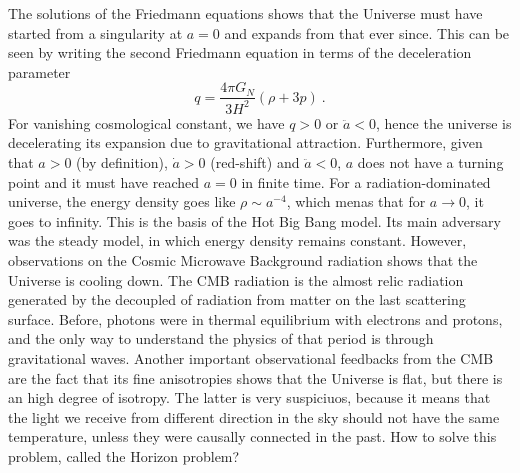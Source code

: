     The solutions of the Friedmann equations shows that the Universe must have started from a singularity at $a = 0$ and expands from that ever since. This can be seen by writing the second Friedmann equation in terms of the deceleration parameter
    \begin{equation*}
        q = \frac{4 \pi G_N}{3 H^2} (\rho + 3 p) ~.
    \end{equation*}
    For vanishing cosmological constant, we have $q > 0$ or $\ddot a < 0$, hence the universe is decelerating its expansion due to gravitational attraction. Furthermore, given that $a > 0$ (by definition), $\dot a > 0$ (red-shift) and $\ddot a < 0$, $a$ does not have a turning point and it must have reached $a = 0$ in finite time. For a radiation-dominated universe, the energy density goes like $\rho \sim a^{-4}$, which menas that for $a \rightarrow 0$, it goes to infinity. This is the basis of the Hot Big Bang model. Its main adversary was the steady model, in which energy density remains constant. However, observations on the Cosmic Microwave Background radiation shows that the Universe is cooling down. The CMB radiation is the almost relic radiation generated by the decoupled of radiation from matter on the last scattering surface. Before, photons were in thermal equilibrium with electrons and protons, and the only way to understand the physics of that period is through gravitational waves. Another important observational feedbacks from the CMB are the fact that its fine anisotropies shows that the Universe is flat, but there is an high degree of isotropy. The latter is very suspiciuos, because it means that the light we receive from different direction in the sky should not have the same temperature, unless they were causally connected in the past. How to solve this problem, called the Horizon problem?

